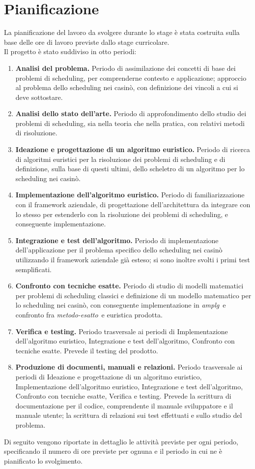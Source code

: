 \section{Pianificazione}
La pianificazione del lavoro da svolgere durante lo stage è stata costruita sulla base delle ore di lavoro previste dallo stage curricolare. \\
Il progetto è stato suddiviso in otto periodi:
\begin{enumerate}
    \item \textbf{Analisi del problema.} Periodo di assimilazione dei concetti di base dei problemi di scheduling, per comprenderne contesto e applicazione; approccio al problema dello scheduling nei casinò, con definizione dei vincoli a cui si deve sottostare.
    \item \textbf{Analisi dello stato dell'arte.} Periodo di approfondimento dello studio dei problemi di scheduling, sia nella teoria che nella pratica, con relativi metodi di risoluzione.
    \item \textbf{Ideazione e progettazione di un algoritmo euristico.} Periodo di ricerca di algoritmi euristici per la risoluzione dei problemi di scheduling e di definizione, sulla base di questi ultimi, dello scheletro di un algoritmo per lo scheduling nei casinò.
    \item \textbf{Implementazione dell'algoritmo euristico.} Periodo di familiarizzazione con il framework aziendale, di progettazione dell'architettura da integrare con lo stesso per estenderlo con la risoluzione dei problemi di scheduling, e conseguente implementazione.
    \item \textbf{Integrazione e test dell'algoritmo.} Periodo di implementazione dell'applicazione per il problema specifico dello scheduling nei casinò utilizzando il framework aziendale già esteso; si sono inoltre svolti i primi test semplificati.
    \item \textbf{Confronto con tecniche esatte.} Periodo di studio di modelli matematici per problemi di scheduling classici e definizione di un modello matematico per lo scheduling nei casinò, con conseguente implementazione in \emph{\gls{amplg}}\glsfirstoccur\ e confronto fra \emph{\gls{metodo-esatto}}\glsfirstoccur\ e euristica prodotta.
    \item \textbf{Verifica e testing.} Periodo trasversale ai periodi di Implementazione dell'algoritmo euristico, Integrazione e test dell'algoritmo, Confronto con tecniche esatte. Prevede il testing del prodotto.
    \item \textbf{Produzione di documenti, manuali e relazioni.} Periodo trasversale ai periodi di Ideazione e progettazione di un algoritmo euristico, Implementazione dell'algoritmo euristico, Integrazione e test dell'algoritmo, Confronto con tecniche esatte, Verifica e testing. Prevede la scrittura di documentazione per il codice, comprendente il manuale sviluppatore e il manuale utente; la scrittura di relazioni sui test effettuati e sullo studio del problema.
\end{enumerate}
Di seguito vengono riportate in dettaglio le attività previste per ogni periodo, specificando il numero di ore previste per ognuna e il periodo in cui ne è pianificato lo svolgimento.

